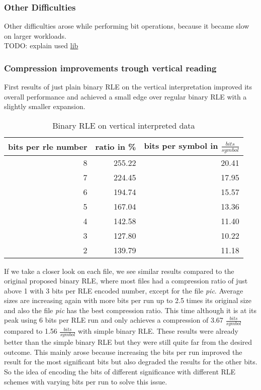 \subsubsection{Other Difficulties}
\par{
Other difficulties arose while performing bit operations, because it became slow on larger workloads. \\

TODO: explain used \href{https://discuss.kotlinlang.org/t/i-o-streams-for-kotlin/9802}{lib}}

\subsubsection{Compression improvements trough vertical reading}
\par{
First results of just plain binary RLE on the vertical interpretation improved its overall performance and achieved a small edge over regular binary RLE with a slightly smaller expansion.
\begin{table}[H]
	\centering
	\begin{tabular}{r|r|r}	
		bits per rle number & ratio in \% & bits per symbol in $\frac{bits}{symbol}$\\
		\hline
		8 & 255.22 & 20.41\\
		7 & 224.45 & 17.95\\
		6 & 194.74 & 15.57\\
		5 & 167.04 & 13.36\\
		4 & 142.58 & 11.40\\
		3 & 127.80 & 10.22\\
		2 & 139.79 & 11.18 \\
	\end{tabular}
	\caption{Binary RLE on vertical interpreted data}
	\label{tab:t30 binary RLE on vertical interpreted data}
\end{table}
}

\par{
If we take a closer look on each file, we see similar results compared to the original proposed binary RLE, where most files had a compression ratio of just above 1 with 3 bits per RLE encoded number, except for the file \textit{pic}. Average sizes are increasing again with more bits per run up to 2.5 times its original size and also the file \textit{pic} has the best compression ratio. This time although it is at its peak using 6 bits per RLE run and only achieves a compression of 3.67 $\frac{bits}{symbol}$ compared to 1.56 $\frac{bits}{symbol}$ with simple binary RLE. These results were already better than the simple binary RLE but they were still quite far from the desired outcome. This mainly arose because increasing the bits per run improved the result for the most significant bits but also degraded the results for the other bits. So the idea of encoding the bits of different significance with different RLE schemes with varying bits per run to solve this issue.  
}

